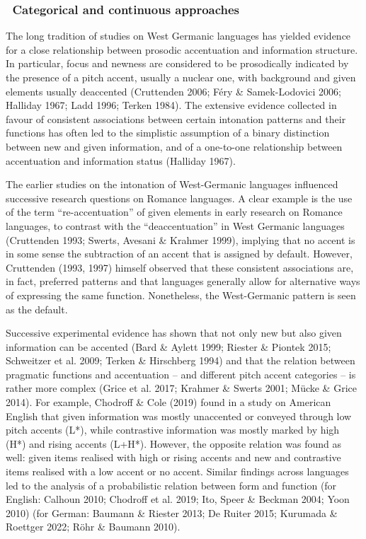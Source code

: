 \subsubsection[\ Categorical and continuous approaches]{\ Categorical and continuous approaches}
\hypertarget{Toc191305886}{}\begin{styleStandard}
The long tradition of studies on West Germanic languages has yielded evidence for a close relationship between prosodic accentuation and information structure. In particular, focus and newness are considered to be prosodically indicated by the presence of a pitch accent, usually a nuclear one, with background and given elements usually deaccented (Cruttenden 2006; Féry \& Samek-Lodovici 2006; Halliday 1967; Ladd 1996; Terken 1984). The extensive evidence collected in favour of consistent associations between certain intonation patterns and their functions has often led to the simplistic assumption of a binary distinction between new and given information, and of a one-to-one relationship between accentuation and information status (Halliday 1967).
\end{styleStandard}

\begin{styleStandard}
The earlier studies on the intonation of West-Germanic languages influenced successive research questions on Romance languages. A clear example is the use of the term “re-accentuation” of given elements in early research on Romance languages, to contrast with the “deaccentuation” in West Germanic languages (Cruttenden 1993; Swerts, Avesani \& Krahmer 1999), implying that no accent is in some sense the subtraction of an accent that is assigned by default. However, Cruttenden (1993, 1997) himself observed that these consistent associations are, in fact, preferred patterns and that languages generally allow for alternative ways of expressing the same function. Nonetheless, the West-Germanic pattern is seen as the default.
\end{styleStandard}

\begin{styleStandard}
Successive experimental evidence has shown that not only new but also given information can be accented (Bard \& Aylett 1999; Riester \& Piontek 2015; Schweitzer et al. 2009; Terken \& Hirschberg 1994) and that the relation between pragmatic functions and accentuation – and different pitch accent categories – is rather more complex (Grice et al. 2017; Krahmer \& Swerts 2001; Mücke \& Grice 2014). For example, Chodroff \& Cole (2019) found in a study on American English that given information was mostly unaccented or conveyed through low pitch accents (L*), while contrastive information was mostly marked by high (H*) and rising accents (L+H*). However, the opposite relation was found as well: given items realised with high or rising accents and new and contrastive items realised with a low accent or no accent. Similar findings across languages led to the analysis of a probabilistic relation between form and function (for English: Calhoun 2010; Chodroff et al. 2019; Ito, Speer \& Beckman 2004; Yoon 2010) (for German: Baumann \& Riester 2013; De Ruiter 2015; Kurumada \& Roettger 2022; Röhr \& Baumann 2010).
\end{styleStandard}

